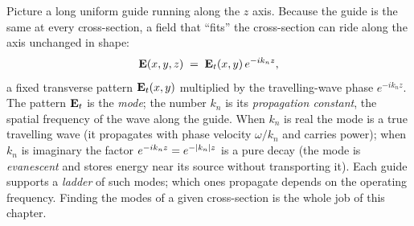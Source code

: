 \begin{physicsbox}
Picture a long uniform guide running along the $z$ axis. Because the guide is the
same at every cross-section, a field that ``fits'' the cross-section can ride along
the axis unchanged in shape:
\[
  \mathbf{E}(x,y,z) \;=\; \mathbf{E}_t(x,y)\,e^{-i k_n z},
\]
a fixed transverse pattern $\mathbf{E}_t(x,y)$ multiplied by the travelling-wave phase
$e^{-i k_n z}$. The pattern $\mathbf{E}_t$ is the \emph{mode}; the number $k_n$ is its
\emph{propagation constant}, the spatial frequency of the wave along the guide.
When $k_n$ is real the mode is a true travelling wave (it propagates with phase
velocity $\omega/k_n$ and carries power); when $k_n$ is imaginary the factor
$e^{-i k_n z}=e^{-\lvert k_n\rvert z}$ is a pure decay (the mode is \emph{evanescent} and
stores energy near its source without transporting it). Each guide supports a
\emph{ladder} of such modes; which ones propagate depends on the operating
frequency. Finding the modes of a given cross-section is the whole job of this
chapter.
\end{physicsbox}

